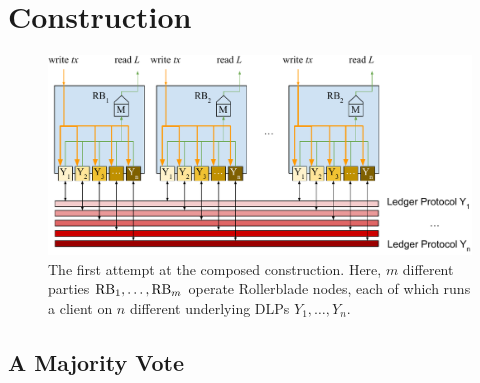 \section{Construction}

\begin{figure}
    \centering
    \includegraphics[width=\textwidth,keepaspectratio]{figures/rollerblade-naive-construction.pdf}
    \caption{The first attempt at the composed construction. Here,
             $m$ different parties $\mathrm{RB}_1, \ldots, \mathrm{RB}_m$ operate Rollerblade
             nodes, each of which runs a client on $n$ different underlying
             DLPs $Y_1, \ldots, Y_n$.}
    \label{fig.naive}
\end{figure}

\subsection{A Majority Vote}

